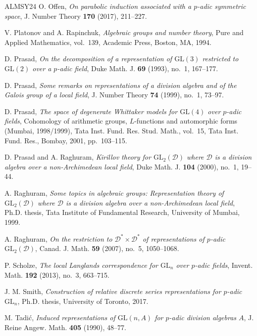\documentclass[11pt]{amsart}
\numberwithin{equation}{section}
\theoremstyle{plain}
\theoremstyle{definition}
\theoremstyle{remark}
\begin{document}
\begin{thebibliography}{ALMSY24}
	O. Offen, \emph{On parabolic induction associated with a $p$-adic symmetric space}, J. Number Theory \textbf{170} (2017), 211--227.
	
	V. Platonov and A. Rapinchuk, \emph{Algebraic groups and number theory}, Pure and Applied Mathematics, vol.~139, Academic Press, Boston, MA, 1994.
	
	D. Prasad, \emph{On the decomposition of a representation of $\mathrm{GL}(3)$ restricted to $\mathrm{GL}(2)$ over a $p$-adic field}, Duke Math. J. \textbf{69} (1993), no.~1, 167--177.
	
	D. Prasad, \emph{Some remarks on representations of a division algebra and of the Galois group of a local field}, J. Number Theory \textbf{74} (1999), no.~1, 73--97.
	
	D. Prasad, \emph{The space of degenerate Whittaker models for $\mathrm{GL}(4)$ over $p$-adic fields}, Cohomology of arithmetic groups, $L$-functions and automorphic forms (Mumbai, 1998/1999), Tata Inst. Fund. Res. Stud. Math., vol.~15, Tata Inst. Fund. Res., Bombay, 2001, pp.~103--115.
	
	D. Prasad and A. Raghuram, \emph{Kirillov theory for $\mathrm{GL}_2(\mathcal{D})$ where $\mathcal{D}$ is a division algebra over a non-Archimedean local field}, Duke Math. J. \textbf{104} (2000), no.~1, 19--44.
	
	A. Raghuram, \emph{Some topics in algebraic groups: Representation theory of $\mathrm{GL}_2(\mathcal{D})$ where $\mathcal{D}$ is a division algebra over a non-Archimedean local field}, Ph.D. thesis, Tata Institute of Fundamental Research, University of Mumbai, 1999.
	
	A. Raghuram, \emph{On the restriction to $\mathcal{D}^*\times\mathcal{D}^*$ of representations of $p$-adic $\mathrm{GL}_2(\mathcal{D})$}, Canad. J. Math. \textbf{59} (2007), no.~5, 1050--1068.
	
	P. Scholze, \emph{The local Langlands correspondence for $\mathrm{GL}_n$ over $p$-adic fields}, Invent. Math. \textbf{192} (2013), no.~3, 663--715.
	
	J. M. Smith, \emph{Construction of relative discrete series representations for $p$-adic $\mathrm{GL}_n$}, Ph.D. thesis, University of Toronto, 2017.
	
	M. Tadi\'c, \emph{Induced representations of $\mathrm{GL}(n,A)$ for $p$-adic division algebras $A$}, J. Reine Angew. Math. \textbf{405} (1990), 48--77.
	

\end{thebibliography}
\end{document}
